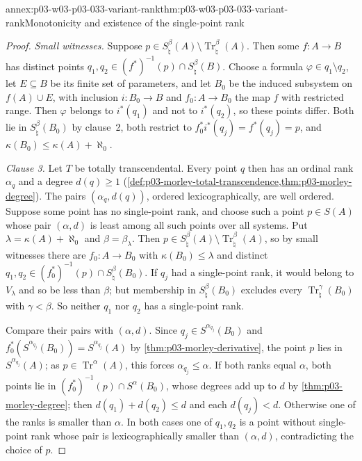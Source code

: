 \begin{annexitem}{annex:p03-w03-p03-033-variant-rank}{thm:p03-w03-p03-033-variant-rank}{Monotonicity and existence of the single-point rank}
\begin{proof}
\emph{Small witnesses.} Suppose \(p\in S_\natural^\beta(A)\setminus
\operatorname{Tr}_\natural^\beta(A)\). Then some \(f:A\to B\) has distinct
points \(q_1,q_2\in(f^*)^{-1}(p)\cap S_\natural^\beta(B)\). Choose a formula
\(\varphi\in q_1\setminus q_2\), let \(E\subseteq B\) be its finite set of
parameters, and let \(B_0\) be the induced subsystem on \(f(A)\cup E\),
with inclusion \(i:B_0\to B\) and \(f_0:A\to B_0\) the map \(f\) with
restricted range. Then \(\varphi\) belongs to \(i^*(q_1)\) and not to
\(i^*(q_2)\), so these points differ. Both lie in \(S_\natural^\beta(B_0)\)
by clause~2, both restrict to \(f_0^*i^*(q_j)=f^*(q_j)=p\), and
\(\kappa(B_0)\leq\kappa(A)+\aleph_0\).

\emph{Clause 3.} Let \(T\) be totally transcendental. Every point \(q\)
then has an ordinal rank \(\alpha_q\) and a degree \(d(q)\geq1\)
(\cref{def:p03-morley-total-transcendence,thm:p03-morley-degree}). The
pairs \((\alpha_q,d(q))\), ordered lexicographically, are well ordered.
Suppose some point has no single-point rank, and choose such a point
\(p\in S(A)\) whose pair \((\alpha,d)\) is least among all such points over
all systems. Put \(\lambda=\kappa(A)+\aleph_0\) and \(\beta=\beta_\lambda\).
Then \(p\in S_\natural^\beta(A)\setminus\operatorname{Tr}_\natural^\beta(A)\),
so by small witnesses there are \(f_0:A\to B_0\) with
\(\kappa(B_0)\leq\lambda\) and distinct
\(q_1,q_2\in(f_0^*)^{-1}(p)\cap S_\natural^\beta(B_0)\). If \(q_j\) had a
single-point rank, it would belong to \(V_\lambda\) and so be less than
\(\beta\); but membership in \(S_\natural^\beta(B_0)\) excludes every
\(\operatorname{Tr}_\natural^\gamma(B_0)\) with \(\gamma<\beta\). So neither
\(q_1\) nor \(q_2\) has a single-point rank.

Compare their pairs with \((\alpha,d)\). Since \(q_j\in
S^{\alpha_{q_j}}(B_0)\) and \(f_0^*(S^{\alpha_{q_j}}(B_0))=
S^{\alpha_{q_j}}(A)\) by \cref{thm:p03-morley-derivative}, the point \(p\)
lies in \(S^{\alpha_{q_j}}(A)\); as \(p\in\operatorname{Tr}^\alpha(A)\),
this forces \(\alpha_{q_j}\leq\alpha\). If both ranks equal \(\alpha\), both
points lie in \((f_0^*)^{-1}(p)\cap S^\alpha(B_0)\), whose degrees add up
to \(d\) by \cref{thm:p03-morley-degree}; then
\(d(q_1)+d(q_2)\leq d\) and each \(d(q_j)<d\). Otherwise one of the ranks
is smaller than \(\alpha\). In both cases one of \(q_1,q_2\) is a point
without single-point rank whose pair is lexicographically smaller than
\((\alpha,d)\), contradicting the choice of \(p\).
\end{proof}
\end{annexitem}

